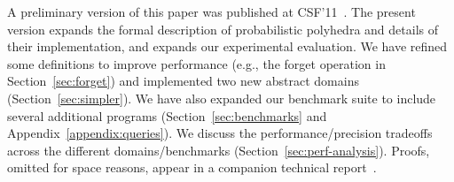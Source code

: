 A preliminary version of this paper was published at
CSF'11~\cite{mardziel11belief}.  The present version expands the
formal description of probabilistic polyhedra and details of their
implementation, and expands our experimental evaluation.  We
have refined some definitions to improve performance (e.g., the forget
operation in Section~\ref{sec:forget}) and implemented two new
abstract domains (Section~\ref{sec:simpler}).  We have also expanded
our benchmark suite to include several additional programs
(Section~\ref{sec:benchmarks} and Appendix~\ref{appendix:queries}).
We discuss the performance/precision tradeoffs across the different
domains/benchmarks (Section~\ref{sec:perf-analysis}).  Proofs, omitted
for space reasons, appear in a companion technical
report~\cite{TR}.



